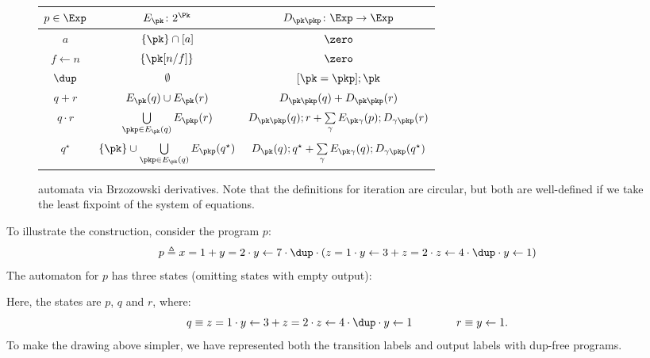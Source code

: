 \begin{figure}
\begin{tabular}{|c|c|c|}
    \hline
    $p \in \Exp$        & $E_{\pk} \colon 2^\Pk$            & $D_{\pk\pkp} \colon \Exp\to\Exp$ \\
    \hline
     $a$             & $\{\pk\} \cap [a]$                       & $\zero$  \\
    $f \gets n$         & $\{\pk[n/f]\}$                     & $\zero$ \\
     $\dup$ &  $\emptyset$                                            & $[\pk=\pkp];\pk$\\
    $q + r$             & $E_{\pk}(q) \cup E_{\pk}(r)$     & $D_{\pk\pkp}(q) + D_{\pk\pkp}(r)$\\
    $q \cdot r$         & $\bigcup\limits_{\pkp\in E_\pk(q)}  E_{\pkp}(r)$ & $D_{\pk\pkp}(q); r + \sum\limits_{\gamma} E_{\pk\gamma}(p);D_{\gamma\pkp}(r)$\\
    $q^\star$           & $\{\pk\} \cup \bigcup\limits_{\pkp\in E_\pk(q)}  E_{\pkp}(q^\star)$                    &  $D_{\pk}(q); q^\star + \sum\limits_{\gamma}E_{\pk\gamma}(q) ; D_{\gamma\pkp}(q^\star)$ \\
    \hline
\end{tabular}
    \caption{\NetKAT automata via Brzozowski derivatives. Note that the definitions for iteration are circular, but both are well-defined if we take the least fixpoint of the system of equations. }
    \label{fig:derivatives}
\end{figure}

\begin{example}\label{ex:automaton}
To illustrate the construction, consider the \NetKAT program $p$:
%
\[
p \triangleq
    x=1 +  y=2\cdot y\gets7\cdot\dup\cdot(z=1\cdot y\gets3 +  z=2\cdot z\gets4\cdot\dup\cdot y\gets1)
\]
%
The automaton for $p$ has three states (omitting states with empty
output):
\begin{center}
\end{center}

\noindent Here, the states are $p$, $q$ and $r$, where:
%
\[
q \equiv z=1\cdot y\gets3 +  z=2\cdot z\gets4\cdot\dup\cdot y\gets1 \qquad\qquad
r \equiv y\gets 1.
\]
%
To make the drawing above simpler, we have represented both the
transition labels and output labels with dup-free \NetKAT programs.
\end{example}

